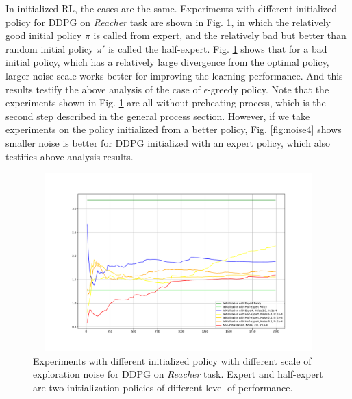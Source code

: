 \documentclass{article}
\begin{document}
In initialized RL, the cases are the same. Experiments with different initialized policy for DDPG on \textit{Reacher} task are shown in Fig. \ref{fig:noise3}, in which the relatively good initial policy $\pi$ is called from expert, and the relatively bad but better than random initial policy $\pi'$ is called the half-expert. Fig. \ref{fig:noise3} shows that for a bad initial policy, which has a relatively large divergence from the optimal policy, larger noise scale works better for improving the learning performance. And this results testify the above analysis of the case of $\epsilon$-greedy policy. Note that the experiments shown in Fig. \ref{fig:noise3} are all without preheating process, which is the second step described in the general process section. However, if we take experiments on the policy initialized from a better policy, Fig. \ref{fig:noise4} shows smaller noise is better for DDPG initialized with an expert policy, which also testifies above analysis results.
\begin{figure}[htbp]
	\centering
	\includegraphics[height=260, width=450]{img/ddpg_compare3.pdf}
	\caption{Experiments with different initialized policy with different scale of exploration noise for DDPG on \textit{Reacher} task. Expert and half-expert are two initialization policies of different level of performance.}
	\label{fig:noise3}
\end{figure}
\end{document}
